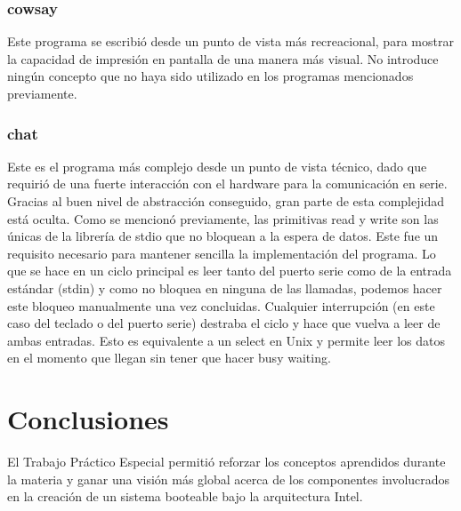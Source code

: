 \documentclass[11pt]{article}
\begin{document}
\subsubsection{cowsay}
Este programa se escribió desde un punto de vista más recreacional, para mostrar la capacidad de impresión en pantalla de una manera más visual. No introduce ningún concepto que no haya sido utilizado en los programas mencionados previamente.

\subsubsection{chat}
Este es el programa más complejo desde un punto de vista técnico, dado que requirió de una fuerte interacción con el hardware para la comunicación en serie. Gracias al buen nivel de abstracción conseguido, gran parte de esta complejidad está oculta. Como se mencionó previamente, las primitivas read y write son las únicas de la librería de stdio que no bloquean a la espera de datos.
Este fue un requisito necesario para mantener sencilla la implementación del programa. Lo que se hace en un ciclo principal es leer tanto del puerto serie como de la entrada estándar (stdin) y como no bloquea en ninguna de las llamadas, podemos hacer este bloqueo manualmente una vez concluidas. Cualquier interrupción (en este caso del teclado o del puerto serie) destraba el ciclo y hace que vuelva a leer de ambas entradas. Esto es equivalente a un select en Unix y permite leer los datos en el momento que llegan sin tener que hacer busy waiting.

\section{Conclusiones}

El Trabajo Práctico Especial permitió reforzar los conceptos aprendidos durante la materia y ganar una visión más global acerca de los componentes involucrados en la creación de un sistema booteable bajo la arquitectura Intel.
\end{document}
